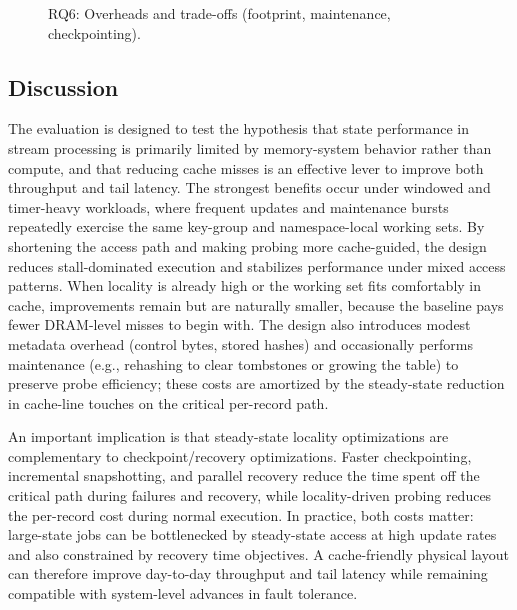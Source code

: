 \documentclass[sigconf]{acmart}
\begin{document}
\begin{figure}[t]
  \centering
  \caption{RQ6: Overheads and trade-offs (footprint, maintenance, checkpointing).}
  \label{fig:rq6-overheads}
\end{figure}

\subsection{Discussion}
The evaluation is designed to test the hypothesis that state performance in stream processing is primarily limited by memory-system behavior rather than compute, and that reducing cache misses is an effective lever to improve both throughput and tail latency.
The strongest benefits occur under windowed and timer-heavy workloads, where frequent updates and maintenance bursts repeatedly exercise the same key-group and namespace-local working sets.
By shortening the access path and making probing more cache-guided, the design reduces stall-dominated execution and stabilizes performance under mixed access patterns. When locality is already high or the working set fits comfortably in cache, improvements remain but are naturally smaller, because the baseline pays fewer DRAM-level misses to begin with. The design also introduces modest metadata overhead (control bytes, stored hashes) and occasionally performs maintenance (e.g., rehashing to clear tombstones or growing the table) to preserve probe efficiency; these costs are amortized by the steady-state reduction in cache-line touches on the critical per-record path.

An important implication is that steady-state locality optimizations are complementary to checkpoint/recovery optimizations. Faster checkpointing, incremental snapshotting, and parallel recovery reduce the time spent off the critical path during failures and recovery, while locality-driven probing reduces the per-record cost during normal execution. In practice, both costs matter: large-state jobs can be bottlenecked by steady-state access at high update rates and also constrained by recovery time objectives. A cache-friendly physical layout can therefore improve day-to-day throughput and tail latency while remaining compatible with system-level advances in fault tolerance.
\end{document}
